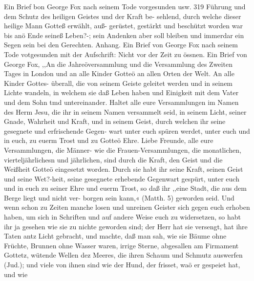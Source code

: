 Ein Brief bon George Fox nach seinem Tode vorgesunden usw. 319
Führung und dem Schutz des heiligen Geistes und der Kraft be-
sehlend, durch welche dieser heilige Mann Gotteß erwählt, auß-
gerüstet, gestärkt und beschützt worden war bis anö Ende seineß
Leben?-; sein Andenken aber soll bleiben und immerdar ein Segen
sein bei den Gerechten.
Anhang.
Ein Brief von George Fox nach seinem Tode votgesunden mit der
Aufschrift: Nicht vor der Zeit zu össnen.
Ein Brief von George Fox,
,,An die Jahreöversammlung und die Versammlung des
Zweiten Tages in London und an alle Kinder Gotteö an allen
Orten der Welt. An alle Kinder Gottes- überall, die von seinem
Geiste geleitet werden und in seinem Lichte wandeln, in welchem
sie daß Leben haben und Einigkeit mit dem Vater und dem Sohn
tmd untereinander. Haltet alle eure Versammlungen im Namen
des Herm Jesu, die ihr in seinem Namen versammelt seid, in
seinem Licht, seiner Gnade, Wahrheit und Kraft, und in seinem
Geist, durch welchen ihr seine gesegnete und erfrischende Gegen-
wart unter euch spüren werdet, unter euch und in euch, zu euerm
Trost und zu Gotteö Ehre.
Liebe Freunde, alle eure Versammlungen, die Männer- wie
die Frauen-Versammlungen, die monatlichen, vierteljährlichesn und
jährlichen, sind durch die Kraft, den Geist und die Weißheit
Gotteö eingesetzt worden. Durch sie habt ihr seine Kraft, seinen
Geist und seine Wet?-heit, seine gesegnete erhebende Gegenwart
gespürt, unter euch und in euch zu seiner Ehre und euerm Trost,
so daß ihr ,,eine Stadt, die aus dem Berge liegt und nicht ver-
borgen sein kann,« (Matth. 5) geworden seid.
Und wenn schon zu Zeiten manche losen und unreinen Geister
sich gegen euch erhoben haben, um sich in Schriften und auf
andere Weise euch zu widersetzen, so habt ihr ja gesehen wie sie
zu nichte geworden sind; der Herr hat sie versengt, hat ihre
Taten antz Licht gebracht, und machte, daß man sah, wie sie
Bäume ohne Früchte, Brunnen ohne Wasser waren, irrige Sterne,
abgesallen am Firmament Gottetz, wütende Wellen dez Meeres,
die ihren Schaum und Schmutz auswerfen (Jud.); und viele von
ihnen sind wie der Hund, der frisset, waö er gespeiet hat, und wie

